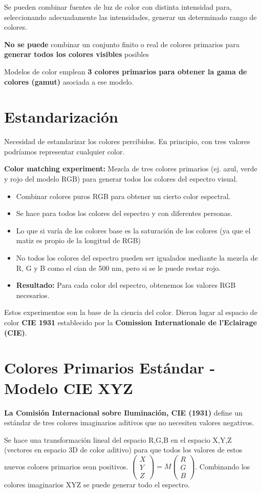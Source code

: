 Se pueden combinar fuentes de luz de color con distinta intensidad para, seleccionando adecuadamente las intensidades, generar un determinado rango de colores.

\textbf{No se puede} combinar un conjunto finito o real de colores primarios para \textbf{generar todos los colores visibles} posibles

Modelos de color emplean \textbf{3 colores primarios para obtener la gama de colores (gamut)} asociada a ese modelo.

\section{Estandarización}
Necesidad de estandarizar los colores percibidos. En principio, con tres valores podríamos representar cualquier color.

\textbf{Color matching experiment:} Mezcla de tres colores primarios (ej. azul, verde y rojo del modelo RGB) para generar todos los colores del espectro visual.
\begin{itemize}
    \item Combinar colores puros RGB para obtener un cierto color espectral.
    \item Se hace para todos los colores del espectro y con diferentes personas.
    \item Lo que si varía de los colores base es la saturación de los colores (ya que el matiz es propio de la longitud de RGB)
    \item No todos los colores del espectro pueden ser igualados mediante la mezcla de R, G y B como el cian de 500 nm, pero si se le puede restar rojo.
    \item \textbf{Resultado:} Para cada color del espectro, obtenemos los valores RGB necesarios.
\end{itemize}

Estos experimentos son la base de la ciencia del color. Dieron lugar al espacio de color \textbf{CIE 1931} establecido por la \textbf{Comission Internationale de l'Eclairage (CIE)}.

\section{Colores Primarios Estándar - Modelo CIE XYZ}
\textbf{La Comisión Internacional sobre Iluminación, CIE (1931)} define un estándar de tres colores imaginarios aditivos que no necesiten valores negativos. 

Se hace una transformación lineal del espacio R,G,B en el espacio X,Y,Z (vectores en espacio 3D de color aditivo) para que todos los valores de estos nuevos colores primarios sean positivos. $\left(\begin{matrix} X \\ Y \\ Z \end{matrix}\right)=M\left(\begin{matrix} R \\ G \\ B \end{matrix}\right)$. Combinando los colores imaginarios XYZ se puede generar todo el espectro.

